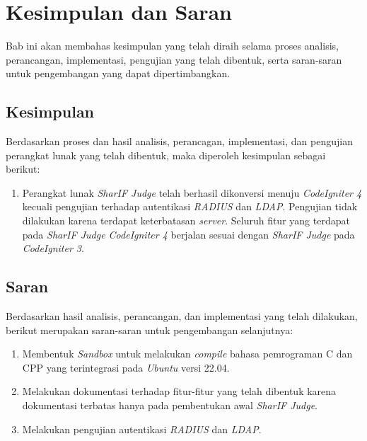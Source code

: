 \chapter{Kesimpulan dan Saran}
\label{chap:kesimpulandansaran}
Bab ini akan membahas kesimpulan yang telah diraih selama proses analisis, perancangan, implementasi, pengujian yang telah dibentuk, serta saran-saran untuk pengembangan yang dapat dipertimbangkan.
\section{Kesimpulan}
Berdasarkan proses dan hasil analisis, perancagan, implementasi, dan pengujian perangkat lunak yang telah dibentuk, maka diperoleh kesimpulan sebagai berikut:
\begin{enumerate}
	\item Perangkat lunak \textit{SharIF Judge} telah berhasil dikonversi menuju \textit{CodeIgniter 4} kecuali pengujian terhadap autentikasi \textit{RADIUS} dan \textit{LDAP}. Pengujian tidak dilakukan karena terdapat keterbatasan \textit{server}. Seluruh fitur yang terdapat pada \textit{SharIF Judge CodeIgniter 4} berjalan sesuai dengan \textit{SharIF Judge} pada \textit{CodeIgniter 3}.
\end{enumerate}

\section{Saran}
Berdasarkan hasil analisis, perancangan, dan implementasi yang telah dilakukan, berikut merupakan saran-saran untuk pengembangan selanjutnya:
\begin{enumerate}
	\item Membentuk \textit{Sandbox} untuk melakukan \textit{compile} bahasa pemrograman C dan CPP yang terintegrasi pada \textit{Ubuntu} versi 22.04.
	\item Melakukan dokumentasi terhadap fitur-fitur yang telah dibentuk karena dokumentasi terbatas hanya pada pembentukan awal \textit{SharIF Judge}.
	\item Melakukan pengujian autentikasi \textit{RADIUS} dan \textit{LDAP}.
\end{enumerate}
